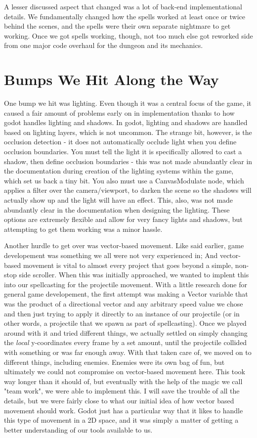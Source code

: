 \documentclass{sigchi}
\begin{document}
A lesser discussed aspect that changed was a lot of back-end implementational details.  We fundamentally changed how the spells worked at least once or twice behind the scenes, and the 
spells were their own separate nightmare to get working.  Once we got spells working, though, not too much else got reworked side from one major code overhaul for the dungeon and its mechanics.


\section{Bumps We Hit Along the Way}
One bump we hit was lighting.  Even though it was a central focus of the game, it caused a fair amount of problems early on in implementation thanks to how godot handles lighting and shadows.  
In godot, lighting and shadows are handled based on lighting layers, which is not uncommon.  The strange bit, however, is the occlusion detection - it does not automatically occlude light 
when you define occlusion boundaries.
You must tell the light it is specifically allowed to cast a shadow, then define occlusion boundaries - this was not made abundantly clear in the 
documentation during creation of the lighting systems within the game, which set us back a tiny bit.  You also must use a CanvasModulate node, which applies a filter over the camera/viewport, 
to darken the scene so the shadows will actually show up and the light will have an effect.  This, also, was not made abundantly clear in the documentation when designing the lighting.  
These options are extremely flexible and allow for very fancy lights and shadows, but attempting to get them working was a minor hassle.

Another hurdle to get over was vector-based movement. Like said earlier, game developement was something we all were not very experienced in; And vector-based movement is vital to almost every
project that goes beyond a simple, non-stop side scroller. When this was initially approached, we wanted to implent this into our spellcasting for the projectile movement. With a little research
done for general game developement, the first attempt was making a Vector variable that was the product of a directional vector and any arbitrary speed value we chose and then just trying to apply
it directly to an instance of our projectile (or in other words, a projectile that we spawn as part of spellcasting). Once we played around with it and tried different things, we actually settled
on simply changing the \emph{local} y-coordinates every frame by a set amount, until the projectile collided with something or was far enough away. With that taken care of, we moved on to different
things, including enemies. Enemies were its own bag of fun, but ultimately we could not compromise on vector-based movement here. This took way longer than it should of, but eventually with the help
of the magic we call "team work", we were able to implement this. I will save the trouble of all the details, but we were fairly close to what our initial idea of how vector based movement should work.
Godot just has a particular way that it likes to handle this type of movement in a 2D space, and it was simply a matter of getting a better understanding of our tools available to us.



\end{document}
